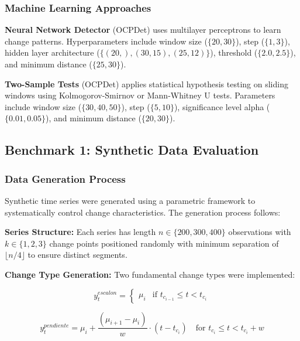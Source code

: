 \documentclass[journal,article,submit,pdftex,moreauthors]{Definitions/mdpi}
\begin{document}
\subsubsection{Machine Learning Approaches}

\textbf{Neural Network Detector} (OCPDet) uses multilayer perceptrons to learn change patterns. Hyperparameters include window size ($\{20, 30\}$), step ($\{1, 3\}$), hidden layer architecture ($\{(20,), (30, 15), (25, 12)\}$), threshold ($\{2.0, 2.5\}$), and minimum distance ($\{25, 30\}$).

\textbf{Two-Sample Tests} (OCPDet) applies statistical hypothesis testing on sliding windows using Kolmogorov-Smirnov or Mann-Whitney U tests. Parameters include window size ($\{30, 40, 50\}$), step ($\{5, 10\}$), significance level alpha ($\{0.01, 0.05\}$), and minimum distance ($\{20, 30\}$).

\subsection{Benchmark 1: Synthetic Data Evaluation}

\subsubsection{Data Generation Process}

Synthetic time series were generated using a parametric framework to systematically control change characteristics. The generation process follows:

\textbf{Series Structure:} Each series has length $n \in \{200, 300, 400\}$ observations with $k \in \{1, 2, 3\}$ change points positioned randomly with minimum separation of $\lfloor n/4 \rfloor$ to ensure distinct segments.

\textbf{Change Type Generation:} Two fundamental change types were implemented:
\begin{linenomath}
\begin{equation}
y_t^{escalon} = \begin{cases}
\mu_i & \text{if } t_{c_{i-1}} \leq t < t_{c_i}
\end{cases}
\end{equation}
\end{linenomath}

\begin{linenomath}
\begin{equation}
y_t^{pendiente} = \mu_i + \frac{(\mu_{i+1} - \mu_i)}{w} \cdot (t - t_{c_i}) \quad \text{for } t_{c_i} \leq t < t_{c_i} + w
\end{equation}
\end{linenomath}
\end{document}
